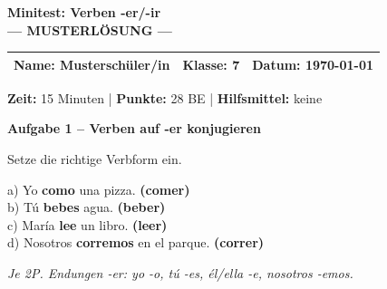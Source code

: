 \documentclass[11pt, a4paper]{article}
\newcommand{\fachfarbe}{spanisch}
\newcommand{\thema}{Minitest: Verben -er/-ir}
\newcommand{\klasse}{7}
\newcommand{\maxpunkte}{28}
\newcommand{\zeit}{15 Minuten}
\newcommand{\datum}{\today}
\newcommand{\punktebox}[1]{\hfill\fbox{\small \_/#1}}
\newcommand{\lsg}[1]{\textcolor{loesung}{\textbf{#1}}}
\newenvironment{aufgabe}[1]{%
    \needspace{5\baselineskip}%
    \nopagebreak[4]%
    \vspace{10pt}
    \noindent\textbf{\textcolor{\fachfarbe}{Aufgabe #1}}
    \nopagebreak[4]%
    \vspace{5pt}
    \nopagebreak[4]%
    \begin{list}{}{\leftmargin=0pt}
    \item[]
}{%
    \end{list}
}
\newcommand{\er}[1]{\textcolor{erfarbe}{\textbf{#1}}}
\begin{document}

\begin{center}
    {\Large\bfseries\textcolor{\fachfarbe}{\thema}}\\[0.3em]
    {\large\textcolor{loesung}{\textbf{--- MUSTERLÖSUNG ---}}}
\end{center}

\vspace{5pt}

\noindent
\begin{tabularx}{\textwidth}{|X|X|X|}
\hline
\textbf{Name:} \lsg{Musterschüler/in} &
\textbf{Klasse:} \klasse &
\textbf{Datum:} \datum \\
\hline
\end{tabularx}

\vspace{10pt}

\begin{infobox}
\textbf{Zeit:} \zeit{} | \textbf{Punkte:} \maxpunkte{} BE | \textbf{Hilfsmittel:} keine
\end{infobox}

\vspace{15pt}


\begin{aufgabe}{1 -- Verben auf \er{-er} konjugieren}
Setze die richtige Verbform ein. \punktebox{8}
\end{aufgabe}

\noindent
a) Yo \lsg{como} una pizza. \er{(comer)}\\[1em]
b) Tú \lsg{bebes} agua. \er{(beber)}\\[1em]
c) María \lsg{lee} un libro. \er{(leer)}\\[1em]
d) Nosotros \lsg{corremos} en el parque. \er{(correr)}

\textit{\textcolor{grau}{Je 2P. Endungen -er: yo -o, tú -es, él/ella -e, nosotros -emos.}}

\vspace{15pt}

\end{document}
